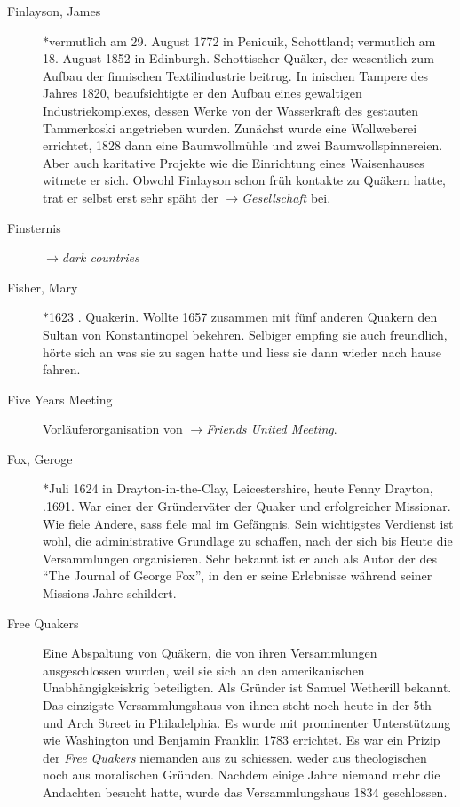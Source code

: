 \begin{description}
 \item[Finlayson, James] $\ast$vermutlich am 29. August 1772 in Penicuik,
 Schottland; \dag vermutlich am 18. August 1852 in Edinburgh. Schottischer
 Quäker, der wesentlich zum Aufbau der finnischen Textilindustrie beitrug. In
 inischen Tampere des Jahres 1820, beaufsichtigte er den Aufbau eines
 gewaltigen Industriekomplexes, dessen Werke von der Wasserkraft des gestauten
 Tammerkoski angetrieben wurden. Zunächst wurde eine Wollweberei errichtet,
 1828 dann eine Baumwollmühle und zwei Baumwollspinnereien. Aber auch
 karitative Projekte wie die Einrichtung eines Waisenhauses witmete er sich.
 Obwohl Finlayson schon früh kontakte zu Quäkern hatte, trat er selbst erst
 sehr späht der $\to$\textit{Gesellschaft} bei.

\item[Finsternis] $\to$\textit{dark countries}

 \item[Fisher, Mary] $\ast$1623 . Quakerin. Wollte 1657 zusammen mit
 fünf anderen Quakern den Sultan von Konstantinopel bekehren. Selbiger empfing
 sie auch freundlich, hörte sich an was sie zu sagen hatte und liess sie dann
 wieder nach hause fahren.

 \item[Five Years Meeting] Vorläuferorganisation von $\to$\textit{Friends
 United Meeting}.

 \item[Fox, Geroge] $\ast$Juli 1624 in Drayton-in-the-Clay, Leicestershire,
 heute Fenny Drayton, .1691. War einer der Gründerväter der Quaker und
 erfolgreicher Missionar. Wie fiele Andere, sass fiele mal im Gefängnis. Sein
 wichtigstes Verdienst ist wohl, die administrative Grundlage zu schaffen, nach
 der sich bis Heute die Versammlungen organisieren. Sehr bekannt ist er auch
 als Autor der des "`The Journal of George Fox"', in den er seine Erlebnisse
 während seiner Missions-Jahre schildert.

 \item[Free Quakers] Eine Abspaltung von Quäkern, die von ihren Versammlungen
 ausgeschlossen wurden, weil sie sich an den amerikanischen Unabhängigkeiskrig
 beteiligten. Als Gründer ist Samuel Wetherill bekannt. Das einzigste
 Versammlungshaus von ihnen steht noch heute in der 5th und Arch Street in
 Philadelphia. Es wurde mit prominenter Unterstützung wie Washington und
 Benjamin Franklin 1783 errichtet. Es war ein Prizip der \textit{Free Quakers}
 niemanden aus zu schiessen. weder aus theologischen noch aus moralischen
 Gründen. Nachdem einige Jahre niemand mehr die Andachten besucht hatte, wurde
 das Versammlungshaus 1834 geschlossen.



\end{description}
